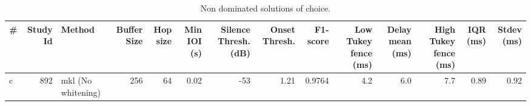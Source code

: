 \begin{table}
\centering
\caption{Non dominated solutions of choice.}
\label{tb:sol}
\begin{tabular}{lrlrrrrrrrrrrr}
\toprule
 \# &  Study Id &              Method &  Buffer Size &  Hop size &  Min IOI (s) &  Silence Thresh. (dB) &  Onset Thresh. &  F1-score &  Low Tukey fence (ms) &  Delay mean (ms) &  High Tukey fence (ms) &  IQR (ms) &  Stdev (ms) \\
\midrule
 c &       892 &  mkl (No whitening) &          256 &        64 &         0.02 &                   -53 &           1.21 &    0.9764 &                   4.2 &              6.0 &                    7.7 &      0.89 &        0.92 \\
\bottomrule
\end{tabular}
\end{table}
